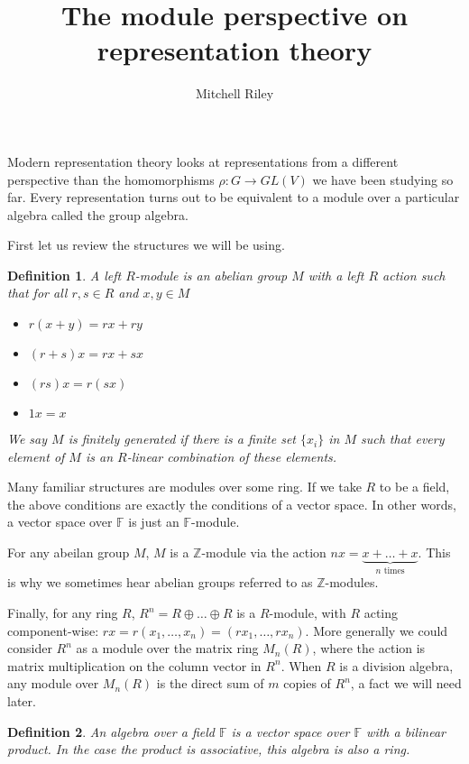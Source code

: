 \documentclass[10pt,a4paper]{article}
\author{Mitchell Riley}
\title{The module perspective on representation theory}
\newtheorem{definition}{Definition}
\begin{document}
\maketitle

Modern representation theory looks at representations from a different perspective than the homomorphisms $\rho : G \to GL(V)$ we have been studying so far. Every representation turns out to be equivalent to a module over a particular algebra called the group algebra.

First let us review the structures we will be using.

\begin{definition}
A \emph{left $R$-module} is an abelian group $M$ with a left $R$ action such that for all $r, s \in R$ and $x, y \in M$
\begin{itemize}
\itemsep0em
\item $r(x+y) = rx + ry$
\item $(r+s)x = rx + sx$
\item $(rs)x = r(sx)$
\item $1x = x$
\end{itemize}
We say $M$ is \emph{finitely generated} if there is a finite set $\{x_i\}$ in $M$ such that every element of $M$ is an $R$-linear combination of these elements.
\end{definition}

Many familiar structures are modules over some ring. If we take $R$ to be a field, the above conditions are exactly the conditions of a vector space. In other words, a vector space over $\mathbb{F}$ is just an $\mathbb{F}$-module.

For any abeilan group $M$, $M$ is a $\mathbb{Z}$-module via the action $nx = \underbrace{x + \dots + x}_{n \text{ times}}$. This is why we sometimes hear abelian groups referred to as $\mathbb{Z}$-modules.

Finally, for any ring $R$, $R^n = R \oplus \dots \oplus R$ is a $R$-module, with $R$ acting component-wise: $rx = r(x_1, \dots, x_n) = (r x_1, \dots, r x_n)$. More generally we could consider $R^n$ as a module over the matrix ring $M_n(R)$, where the action is matrix multiplication on the column vector in $R^n$. When $R$ is a division algebra, any module over $M_n(R)$ is the direct sum of $m$ copies of $R^n$, a fact we will need later.

\begin{definition}
An \emph{algebra over a field $\mathbb{F}$} is a vector space over $\mathbb{F}$ with a bilinear product. In the case the product is associative, this algebra is also a ring.
\end{definition}
\end{document}
